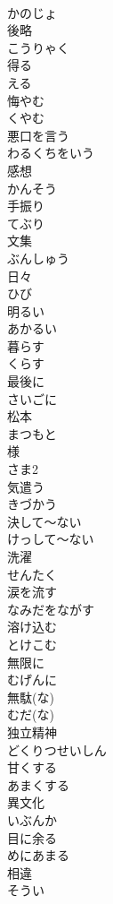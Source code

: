 \documentclass[8pt]{extreport}
\begin{document}
\begin{CJK}{UTF8}{min}
\\	かのじょ
\\	後略	
\\	こうりゃく
\\	得る	
\\	える
\\	悔やむ	
\\	くやむ
\\	悪口を言う	
\\	わるくちをいう
\\	感想	
\\	かんそう
\\	手振り	
\\	てぶり
\\	文集	
\\	ぶんしゅう
\\	日々	
\\	ひび
\\	明るい	
\\	あかるい
\\	暮らす	
\\	くらす
\\	最後に	
\\	さいごに
\\	松本	
\\	まつもと
\\	様	
\\	さま2
\\	気遣う	
\\	きづかう
\\	決して～ない	
\\	けっして～ない
\\	洗濯	
\\	せんたく
\\	涙を流す	
\\	なみだをながす
\\	溶け込む	
\\	とけこむ
\\	無限に	
\\	むげんに
\\	無駄(な)	
\\	むだ(な)
\\	独立精神	
\\	どくりつせいしん
\\	甘くする	
\\	あまくする
\\	異文化	
\\	いぶんか
\\	目に余る	
\\	めにあまる
\\	相違	
\\	そうい

\end{CJK}
\end{document}
